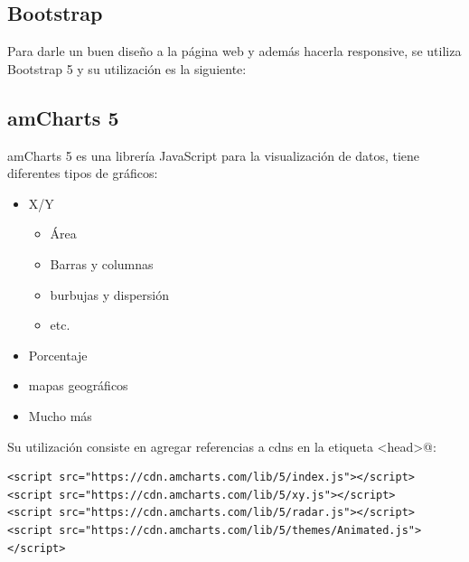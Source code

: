 \documentclass[oneside]{article}
\begin{document}
\subsection*{Bootstrap}
Para darle un buen diseño a la página web y además hacerla responsive, se utiliza Bootstrap 5 y su utilización es la siguiente:

\subsection*{amCharts 5}
amCharts 5 es una librería JavaScript para la visualización de datos, tiene diferentes tipos de gráficos:
\begin{itemize}
\item X/Y
\begin{itemize}
\item Área
\item Barras y columnas
\item burbujas y dispersión
\item etc.
\end{itemize}
\item Porcentaje
\item mapas geográficos
\item Mucho más
\end{itemize}

Su utilización consiste en agregar referencias a cdns en la etiqueta \verb@<head>@:
\begin{lstlisting}
<script src="https://cdn.amcharts.com/lib/5/index.js"></script>
<script src="https://cdn.amcharts.com/lib/5/xy.js"></script>
<script src="https://cdn.amcharts.com/lib/5/radar.js"></script>
<script src="https://cdn.amcharts.com/lib/5/themes/Animated.js"></script>
\end{lstlisting}
\end{document}
